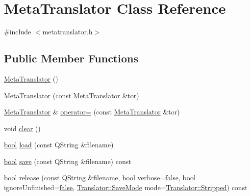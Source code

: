 \hypertarget{classMetaTranslator}{}\section{Meta\+Translator Class Reference}
\label{classMetaTranslator}


{\ttfamily \#include $<$metatranslator.\+h$>$}

\subsection*{Public Member Functions}
\begin{DoxyCompactItemize}
\item 
\hyperlink{classMetaTranslator_a98ac314409ee2b8059c4969e83f8fd56}{Meta\+Translator} ()
\item 
\hyperlink{classMetaTranslator_a6af9d90fd6364213c4420bfcd26e588a}{Meta\+Translator} (const \hyperlink{classMetaTranslator}{Meta\+Translator} \&tor)
\item 
\hyperlink{classMetaTranslator}{Meta\+Translator} \& \hyperlink{classMetaTranslator_a2352e8125907f8062c97041e0716d62c}{operator=} (const \hyperlink{classMetaTranslator}{Meta\+Translator} \&tor)
\item 
void \hyperlink{classMetaTranslator_af110abad5057b337aef8268f0548bab9}{clear} ()
\item 
\hyperlink{compiler_8h_abb452686968e48b67397da5f97445f5b}{bool} \hyperlink{classMetaTranslator_ad2031826d53e3648996ca1a749e80cb9}{load} (const Q\+String \&filename)
\item 
\hyperlink{compiler_8h_abb452686968e48b67397da5f97445f5b}{bool} \hyperlink{classMetaTranslator_a51da1f00daf7fa00bcfe61aab4331924}{save} (const Q\+String \&filename) const 
\item 
\hyperlink{compiler_8h_abb452686968e48b67397da5f97445f5b}{bool} \hyperlink{classMetaTranslator_a521371d724c1a00328db396d39c1486c}{release} (const Q\+String \&filename, \hyperlink{compiler_8h_abb452686968e48b67397da5f97445f5b}{bool} verbose=\hyperlink{compiler_8h_a65e9886d74aaee76545e83dd09011727}{false}, \hyperlink{compiler_8h_abb452686968e48b67397da5f97445f5b}{bool} ignore\+Unfinished=\hyperlink{compiler_8h_a65e9886d74aaee76545e83dd09011727}{false}, \hyperlink{classTranslator_aefe656fdfa14952a99d6d25e61749a99}{Translator\+::\+Save\+Mode} mode=\hyperlink{classTranslator_aefe656fdfa14952a99d6d25e61749a99a68d586d3f7ea596c2a5d1252fad326d6}{Translator\+::\+Stripped}) const 
\item 

\end{DoxyCompactItemize}
